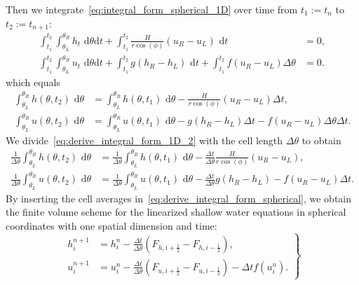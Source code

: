 Then we integrate~\eqref{eq:integral_form_spherical_1D} over time from $t_1:= t_n$ to $t_2:= t_{n+1}$:
\begin{equation}
    \begin{aligned}
        \int_{t_1}^{t_2} \int_{\theta_L}^{\theta_R} h_t \text{ d}\theta \text{d}t + \int_{t_1}^{t_2} \frac{H}{r \cos(\phi)} (u_R - u_L) \text{ d}t &= 0, \\
        \int_{t_1}^{t_2} \int_{\theta_L}^{\theta_R} u_t \text{ d}\theta \text{d}t + \int_{t_1}^{t_2} g(h_R - h_L) \text{ d}t + \int_{t_1}^{t_2} f(u_R - u_L) \Delta \theta &= 0.
    \end{aligned}
\end{equation}
which equals
\begin{equation}\label{eq:integral_form_spherical_1D_2}
    \begin{aligned}
        \int_{\theta_L}^{\theta_R} h(\theta, t_2) \text{ d}\theta &= \int_{\theta_L}^{\theta_R} h(\theta, t_1) \text{ d}\theta - \frac{H}{r \cos(\phi)} (u_R - u_L) \Delta t, \\
        \int_{\theta_L}^{\theta_R} u(\theta, t_2) \text{ d}\theta &= \int_{\theta_L}^{\theta_R} u(\theta, t_1) \text{ d}\theta - g(h_R - h_L) \Delta t - f(u_R - u_L) \Delta \theta \Delta t.
    \end{aligned}
\end{equation}
We divide~\eqref{eq:derive_integral_form_1D_2} with the cell length $\Delta \theta$ to obtain 
\begin{equation}\label{eq:derive_integral_form_spherical}
    \begin{aligned}
        \frac{1}{\Delta \theta} \int_{\theta_L}^{\theta_R} h(\theta, t_2) \text{ d}\theta &= \frac{1}{\Delta \theta} \int_{\theta_L}^{\theta_R} h(\theta, t_1) \text{ d}\theta -  \frac{\Delta t}{\Delta \theta} \frac{H}{r \cos(\phi)} (u_R - u_L), \\
        \frac{1}{\Delta \theta} \int_{\theta_L}^{\theta_R} u(\theta, t_2) \text{ d}\theta &= \frac{1}{\Delta \theta} \int_{\theta_L}^{\theta_R} u(\theta, t_1) \text{ d}\theta - \frac{\Delta t}{\Delta \theta} g(h_R - h_L)  - f(u_R - u_L) \Delta t.
    \end{aligned}
\end{equation}
By inserting the cell averages in~\eqref{eq:derive_integral_form_spherical}, we obtain the finite volume scheme for the linearized shallow water equations in spherical coordinates with one spatial dimension and time:
\begin{equation}
    \left.
    \begin{aligned}
        h_i^{n+1} &= h_i^n - \frac{\Delta t}{\Delta \theta} (F_{h, i + \frac{1}{2}} - F_{h, i - \frac{1}{2}}),  \\
        u_i^{n+1} &=  u_i^n - \frac{\Delta t}{\Delta \theta} (F_{u, i + \frac{1}{2}} - F_{u, i - \frac{1}{2}}) - \Delta t f(u_{i}^n).
    \end{aligned}
    \right\}
\end{equation}
